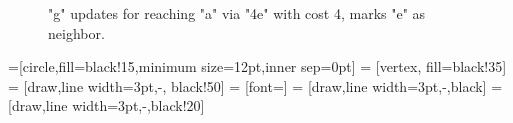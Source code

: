 \documentclass[12pt, oneandhalf, chaparabic, sees, ms]{metu}
\begin{document}
\begin{center}
\begin{figure}[!htp]
\begin{center}
   \end{center}
    \caption{"g" updates for reaching "a" via "4e" with cost 4, marks "e" as neighbor.}
    \label{fig:lagoon-graph5d}
  \end{figure}
\end{center}
 
 
 
 
 
 
 
 
 

 =[circle,fill=black!15,minimum size=12pt,inner sep=0pt]
  = [vertex, fill=black!35]
  = [draw,line width=3pt,-, black!50]
  = [font=\small]
  = [draw,line width=3pt,-,black]
  = [draw,line width=3pt,-,black!20]
 
%  
%  

 
 
\end{document}

